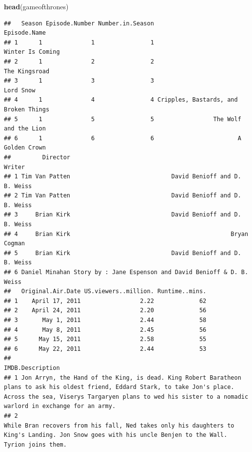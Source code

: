 \documentclass[]{article}
\newenvironment{Shaded}{\begin{snugshade}}{\end{snugshade}}
\newcommand{\KeywordTok}[1]{\textcolor[rgb]{0.13,0.29,0.53}{\textbf{#1}}}
\newcommand{\NormalTok}[1]{#1}
\begin{document}
\begin{Shaded}
\begin{Highlighting}[]
\KeywordTok{head}\NormalTok{(gameofthrones)}
\end{Highlighting}
\end{Shaded}

\begin{verbatim}
##   Season Episode.Number Number.in.Season                          Episode.Name
## 1      1              1                1                      Winter Is Coming
## 2      1              2                2                         The Kingsroad
## 3      1              3                3                             Lord Snow
## 4      1              4                4 Cripples, Bastards, and Broken Things
## 5      1              5                5                 The Wolf and the Lion
## 6      1              6                6                        A Golden Crown
##         Director                                                    Writer
## 1 Tim Van Patten                             David Benioff and D. B. Weiss
## 2 Tim Van Patten                             David Benioff and D. B. Weiss
## 3     Brian Kirk                             David Benioff and D. B. Weiss
## 4     Brian Kirk                                              Bryan Cogman
## 5     Brian Kirk                             David Benioff and D. B. Weiss
## 6 Daniel Minahan Story by : Jane Espenson and David Benioff & D. B. Weiss 
##   Original.Air.Date US.viewers..million. Runtime..mins.
## 1    April 17, 2011                 2.22             62
## 2    April 24, 2011                 2.20             56
## 3       May 1, 2011                 2.44             58
## 4       May 8, 2011                 2.45             56
## 5      May 15, 2011                 2.58             55
## 6      May 22, 2011                 2.44             53
##                                                                                                                                                                                                                             IMDB.Description
## 1 Jon Arryn, the Hand of the King, is dead. King Robert Baratheon plans to ask his oldest friend, Eddard Stark, to take Jon's place. Across the sea, Viserys Targaryen plans to wed his sister to a nomadic warlord in exchange for an army.
## 2                                                                                     While Bran recovers from his fall, Ned takes only his daughters to King's Landing. Jon Snow goes with his uncle Benjen to the Wall. Tyrion joins them.

\end{verbatim}
\end{document}
